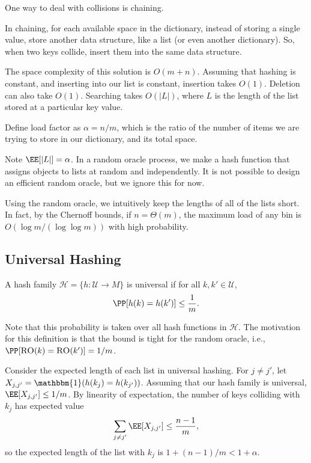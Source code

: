 \begin{example}
\exlabel

One way to deal with collisions is \ac{chaining}. 
\end{example}

In chaining, for each available space in the dictionary, instead of storing a single value, store another data structure, like a list (or even another dictionary). So, when two keys collide, insert them into the same data structure. 

The space complexity of this solution is $O(m+n)$. Assuming that hashing is constant, and inserting into our list is constant, insertion takes $O(1)$. Deletion can also take $O(1)$. Searching takes $O(\vert L\vert)$, where $L$ is the length of the list stored at a particular key value.

\begin{definition}

Define \ac{load factor} as $\alpha = n/m$, which is the ratio of the number of items we are trying to store in our dictionary, and its total space. 
\end{definition}

Note $\EE[\vert L\vert] = \alpha$. In a \ac{random oracle} process, we make a hash function that assigns objects to lists at random and independently. It is not possible to design an efficient random oracle, but we ignore this for now. 

Using the random oracle, we intuitively keep the lengths of all of the lists short. In fact, by the Chernoff bounds, if $n=\Theta(m)$, the maximum load of any bin is $O(\log m/(\log \log m))$ with high probability. 

\subsection{Universal Hashing}

\begin{definition}

A hash family $\mathcal{H} = \{h : \mathcal{U}\rightarrow M\}$ is \ac{universal} if for all $k, k'\in \mathcal{U}$,
\[\PP[h(k) = h(k')]\leq \frac{1}{m}.\]
\end{definition}

Note that this probability is taken over all hash functions in $\mathcal{H}$. The motivation for this definition is that the bound is tight for the random oracle, i.e., $\PP[\textsc{RO}(k) = \textsc{RO}(k')]=1/m$.

Consider the expected length of each list in universal hashing. For $j\neq j'$, let $X_{j,j'}=\mathbbm{1}(h(k_j)=h(k_{j'}))$. Assuming that our hash family is universal, $\EE[X_{j,j'}]\leq 1/m$. By linearity of expectation, the number of keys colliding with $k_j$ has expected value 
\[\sum_{j\neq j'}\EE[X_{j,j'}] \leq \frac{n-1}{m},\]
so the expected length of the list with $k_j$ is $1+(n-1)/m < 1+\alpha$.

